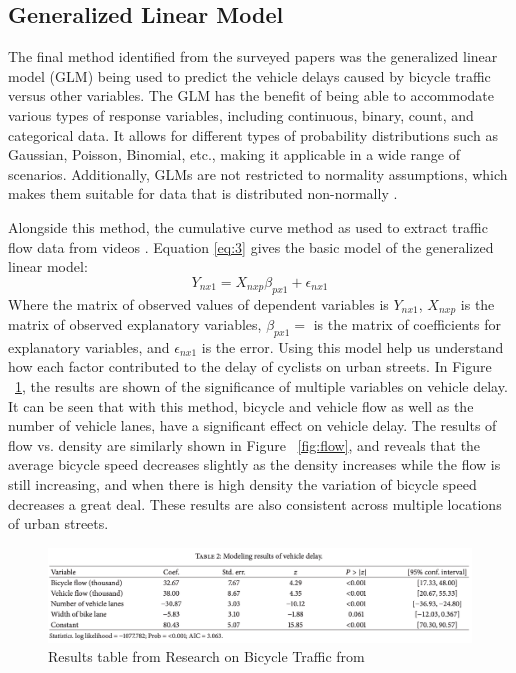 \documentclass[12pt, letterpaper]{article}
\begin{document}
\subsection{Generalized Linear Model}
\label{sec:gen}

The final method identified from the surveyed papers was the generalized linear model (GLM) being used to predict the vehicle delays caused by bicycle traffic versus other variables. The GLM has the benefit of being able to accommodate various types of response variables, including continuous, binary, count, and categorical data. It allows for different types of probability distributions such as Gaussian, Poisson, Binomial, etc., making it applicable in a wide range of scenarios. Additionally, GLMs are not restricted to normality assumptions, which makes them suitable for data that is distributed non-normally \cite{PennState2023}.

Alongside this method, the cumulative curve method as used to extract traffic flow data from videos \cite{6Pu2017}. Equation \ref{eq:3} gives the basic model of the generalized linear model:
\begin{equation}\label{eq:3}
Y_{nx1} = X_{nxp}\beta_{px1}+\epsilon_{nx1}
\end{equation}
Where the matrix of observed values of dependent variables is  $Y_{nx1}$, $X_{nxp}$ is the matrix of observed explanatory variables, $\beta_{px1} =$ is the matrix of coefficients for explanatory variables, and $\epsilon_{nx1}$ is the error. Using this model help us understand how each factor contributed to the delay of cyclists on urban streets. In Figure ~\ref{fig:traffic}, the results are shown of the significance of multiple variables on vehicle delay. It can be seen that with this method, bicycle and vehicle flow as well as the number of vehicle lanes, have a significant effect on vehicle delay. The results of flow vs. density are similarly shown in Figure ~\ref{fig:flow}, and reveals that the average bicycle speed decreases slightly as the density increases while the flow is still increasing, and  when there is high density the variation of bicycle speed decreases a great deal. These results are also consistent across multiple locations of urban streets. \par

\begin{figure}[tbp]
    \centering \includegraphics[width=1\textwidth]{BikeTrafficResults.png}
    \caption{Results table from Research on Bicycle Traffic from \citet{6Pu2017}}
    \label{fig:traffic}
\end{figure}
\end{document}
